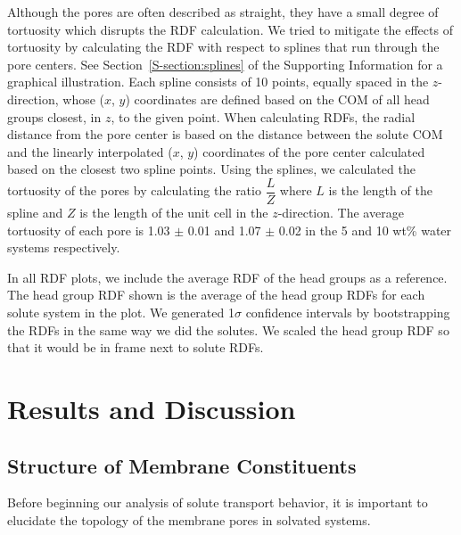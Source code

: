 \documentclass[journal=jpcbfk,manuscript=article]{achemso}
\begin{document}
  Although the pores are often described as straight, they have a
  small degree of tortuosity which disrupts the RDF calculation. We 
  tried to mitigate the effects of tortuosity by calculating the RDF
  with respect to splines that run through the pore centers. See
  Section~\ref{S-section:splines} of the Supporting Information for 
  a graphical illustration. Each spline consists of 10 points, equally
  spaced in the $z$-direction, whose ($x$, $y$) coordinates are defined
  based on the COM of all head groups closest, in $z$, to the
  given point. When calculating RDFs, the radial distance from the pore 
  center is based on the distance between the solute COM and
  the linearly interpolated ($x$, $y$) coordinates of the pore center 
  calculated based on the closest two spline points. Using the splines, 
  we calculated the tortuosity of the pores by calculating the ratio 
  $\dfrac{L}{Z}$ where $L$ is the length of the spline and $Z$ is the 
  length of the unit cell in the $z$-direction. The average tortuosity
  of each pore is 1.03 $\pm$ 0.01 and 1.07 $\pm$ 0.02 in the 5 and 10 wt\%
  water systems respectively.
  
  In all RDF plots, we include the average RDF of the head groups as a 
  reference. The head group RDF shown is the average of the head group
  RDFs for each solute system in the plot. We generated 1$\sigma$ 
  confidence intervals by bootstrapping the RDFs in the same way we did
  the solutes. We scaled the head group RDF so that it would be in frame
  next to solute RDFs.

   
  \section{Results and Discussion}
  
  \subsection{Structure of Membrane Constituents}\label{section:membrane_components} 
  
  Before beginning our analysis of solute transport behavior, it is important to
  elucidate the topology of the membrane pores in solvated systems.  
  
\end{document}
